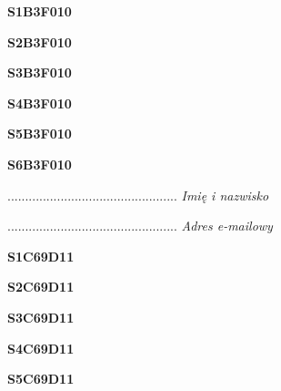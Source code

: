 \begin{turn}{90}\huge \textbf{S1B3F010}\end{turn}

\begin{turn}{90}\huge \textbf{S2B3F010}\end{turn}

\begin{turn}{90}\huge \textbf{S3B3F010}\end{turn}

\begin{turn}{90}\huge \textbf{S4B3F010}\end{turn}

\begin{turn}{90}\huge \textbf{S5B3F010}\end{turn}

\begin{turn}{90}\huge \textbf{S6B3F010}\end{turn}

\begin{turn}{90}\begin{minipage}{\linewidth} \vspace{20mm} ................................................  \textit{Imię i nazwisko}\end{minipage}\end{turn}

\begin{turn}{90}\begin{minipage}{\linewidth} \vspace{20mm} ................................................  \textit{Adres e-mailowy}\end{minipage}\end{turn}

\begin{turn}{90}\huge \textbf{S1C69D11}\end{turn}

\begin{turn}{90}\huge \textbf{S2C69D11}\end{turn}

\begin{turn}{90}\huge \textbf{S3C69D11}\end{turn}

\begin{turn}{90}\huge \textbf{S4C69D11}\end{turn}

\begin{turn}{90}\huge \textbf{S5C69D11}\end{turn}

